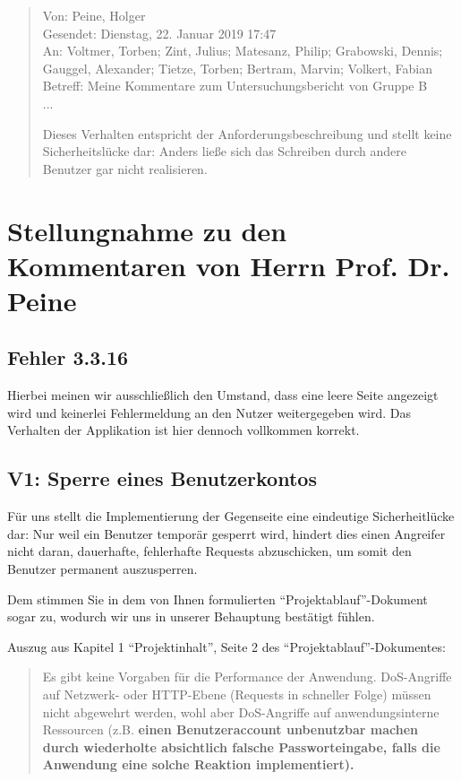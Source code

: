 \documentclass[12pt,DIV14,BCOR10mm,a4paper,parskip=half-,headsepline,headinclude,english,ngerman,bibliography=totocnumbered]{scrreprt}
\begin{document}
\blockquote{
Von: Peine, Holger \\
Gesendet: Dienstag, 22. Januar 2019 17:47 \\
An: Voltmer, Torben; Zint, Julius; Matesanz, Philip; Grabowski, Dennis; Gauggel, Alexander; Tietze, Torben; Bertram, Marvin; Volkert, Fabian  \\
Betreff: Meine Kommentare zum Untersuchungsbericht von Gruppe B \\

...

Dieses Verhalten entspricht der Anforderungsbeschreibung und stellt
keine Sicherheitslücke dar: Anders ließe sich das Schreiben durch andere
Benutzer gar nicht realisieren.
}

\chapter{Stellungnahme zu den Kommentaren von Herrn Prof. Dr. Peine}

\section{Fehler 3.3.16}

Hierbei meinen wir ausschließlich den Umstand, dass eine leere Seite angezeigt wird und keinerlei Fehlermeldung an den Nutzer weitergegeben wird.
Das Verhalten der Applikation ist hier dennoch vollkommen korrekt.

\section{V1: Sperre eines Benutzerkontos}

Für uns stellt die Implementierung der Gegenseite eine eindeutige Sicherheitlücke dar: Nur weil ein Benutzer temporär gesperrt wird, hindert dies einen Angreifer nicht daran, dauerhafte, fehlerhafte Requests abzuschicken, um somit den Benutzer permanent auszusperren.

Dem stimmen Sie in dem von Ihnen formulierten \enquote{Projektablauf}-Dokument sogar zu, wodurch wir uns in unserer Behauptung bestätigt fühlen.

Auszug aus Kapitel 1 \enquote{Projektinhalt}, Seite 2 des \enquote{Projektablauf}-Dokumentes:

\blockquote{
Es gibt keine Vorgaben für die Performance der Anwendung. DoS-Angriffe auf Netzwerk- oder HTTP-Ebene (Requests in schneller Folge) müssen nicht abgewehrt werden, wohl aber DoS-Angriffe auf anwendungsinterne Ressourcen (z.B. \textbf{einen Benutzeraccount unbenutzbar machen durch wiederholte absichtlich falsche Passworteingabe, falls die Anwendung eine solche Reaktion implementiert).}
}
\end{document}
